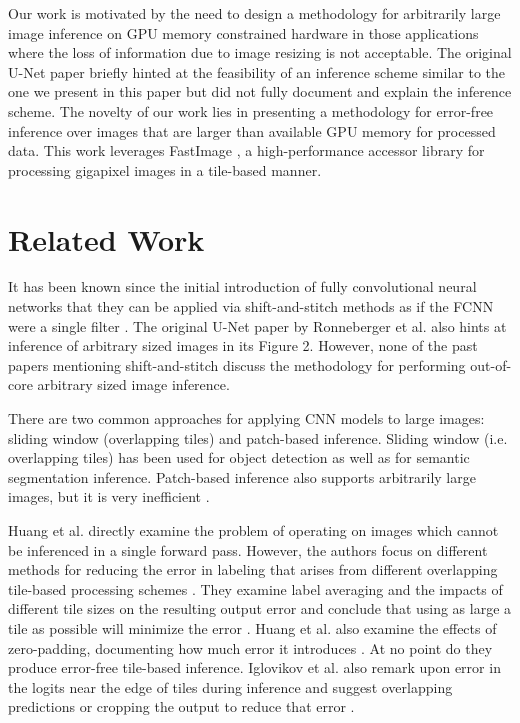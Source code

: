 \documentclass[runningheads]{llncs}
\begin{document}
Our work is motivated by the need to design a methodology for arbitrarily large image inference on GPU memory constrained hardware in those applications where the loss of information due to image resizing is not acceptable. The original U-Net paper \cite{Ronneberger2015a} briefly hinted at the feasibility of an inference scheme similar to the one we present in this paper but did not fully document and explain the inference scheme. 
The novelty of our work lies in presenting a methodology for error-free inference over images that are larger than available GPU memory for processed data. This work leverages FastImage \cite{Bardakoff2019}, a high-performance accessor library for processing gigapixel images in a tile-based manner.

\section{Related Work}
\label{related-work}

It has been known since the initial introduction of fully convolutional neural networks that they can be applied via shift-and-stitch methods as if the FCNN were a single filter \cite{Long2015,Sherrah2016}.
The original U-Net paper by Ronneberger et al. \cite{Ronneberger2015a} also hints at inference of arbitrary sized images in its Figure 2. However, none of the past papers mentioning shift-and-stitch discuss the methodology for performing out-of-core arbitrary sized image inference.

There are two common approaches for applying CNN models to large images: sliding window (overlapping tiles) and patch-based inference. Sliding window (i.e. overlapping tiles) has been used for object detection \cite{Sermanet2013,VanEtten2019} as well as for semantic segmentation \cite{Lin2019,Volpi2017a} inference. Patch-based inference also supports arbitrarily large images, but it is very inefficient \cite{Volpi2017a,Maggiori2016}.

Huang et al. directly examine the problem of operating on images which cannot be inferenced in a single forward pass. However, the authors focus on different methods for reducing the error in labeling that arises from different overlapping tile-based processing schemes \cite{Huang2019a}. They examine label averaging and the impacts of different tile sizes on the resulting output error and conclude that using as large a tile as possible will minimize the error \cite{Huang2019a}. Huang et al. also examine the effects of zero-padding, documenting how much error it introduces \cite{Huang2019a}. At no point do they produce error-free tile-based inference. Iglovikov et al. also remark upon error in the logits near the edge of tiles during inference and suggest overlapping predictions or cropping the output to reduce that error \cite{Iglovikov2017}. 
\end{document}

